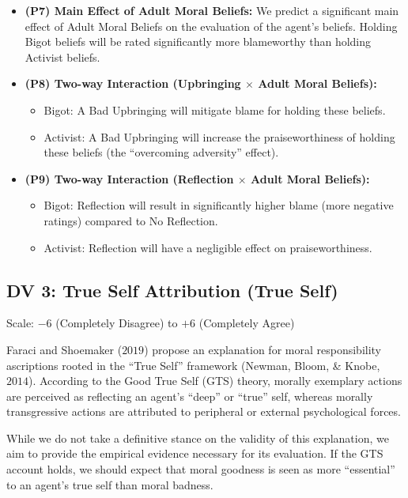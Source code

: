 \documentclass[scrarticle]{scrartcl}
\begin{document}
\begin{itemize}
   \item[--] \textsf{\textbf{(P7) Main Effect of Adult Moral Beliefs:}} We predict a significant main effect of Adult Moral Beliefs on the evaluation of the agent's beliefs. Holding Bigot beliefs will be rated significantly more blameworthy than holding Activist beliefs.
   \item[--] \textsf{\textbf{(P8) Two-way Interaction (Upbringing $\times$ Adult Moral Beliefs):}}
   \begin{itemize}
      \item[--] Bigot: A Bad Upbringing will mitigate blame for holding these beliefs.
      \item[--] Activist: A Bad Upbringing will increase the praiseworthiness of holding these beliefs (the \enquote{overcoming adversity} effect).
   \end{itemize}
   \item[--] \textsf{\textbf{(P9) Two-way Interaction (Reflection $\times$ Adult Moral Beliefs):}}
   \begin{itemize}
      \item[--] Bigot: Reflection will result in significantly higher blame (more negative ratings) compared to No Reflection.
      \item[--] Activist: Reflection will have a negligible effect on praiseworthiness.
   \end{itemize}
\end{itemize}


\subsection*{DV 3: True Self Attribution (True Self)}
Scale: $-6$ (Completely Disagree) to $+6$ (Completely Agree)

\vspace{0.75em}
\noindent Faraci and Shoemaker ($2019$) propose an explanation for moral responsibility ascriptions rooted in the \enquote{True Self} framework (Newman, Bloom, \& Knobe, $2014$).
According to the Good True Self (GTS) theory, morally exemplary actions are perceived as reflecting an agent's \enquote{deep} or \enquote{true} self, whereas morally transgressive actions are attributed to peripheral or external psychological forces.

While we do not take a definitive stance on the validity of this explanation, we aim to provide the empirical evidence necessary for its evaluation.
If the GTS account holds, we should expect that moral goodness is seen as more \enquote{essential} to an agent's true self than moral badness.
\end{document}
